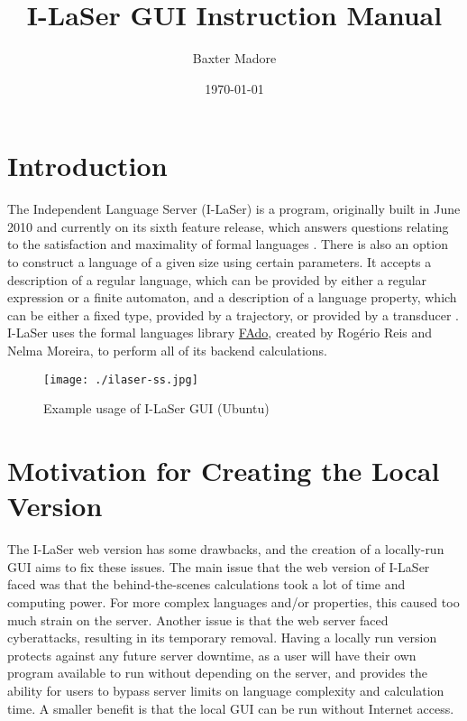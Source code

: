 \documentclass{article}
\title{I-LaSer GUI Instruction Manual}
\author{Baxter Madore}
\date{\today}
\begin{document}
\maketitle
\tableofcontents

\section{Introduction}
\par The Independent Language Server (I-LaSer) is a program, originally built in June 2010 and currently on its sixth feature release, which answers questions relating to the satisfaction and maximality of formal languages \cite{Properties}. There is also an option to construct a language of a given size using certain parameters. It accepts a description of a regular language, which can be provided by either a regular expression or a finite automaton, and a description of a language property, which can be either a fixed type, provided by a trajectory, or provided by a transducer \cite{LaSer}.
I-LaSer uses the formal languages library \href{https://fado.dcc.fc.up.pt/}{FAdo}\cite{FAdo}, created by Rogério Reis and Nelma Moreira, to perform all of its backend calculations.

\begin{center}
\begin{figure}[htb]
\texttt{[image: ./ilaser-ss.jpg]}
\caption{Example usage of I-LaSer GUI (Ubuntu)}
\end{figure}
\end{center}

\section{Motivation for Creating the Local Version}
\par The I-LaSer web version has some drawbacks, and the creation of a locally-run GUI aims to fix these issues.
The main issue that the web version of I-LaSer faced was that the behind-the-scenes calculations took a lot of time and computing power. For more complex languages and/or properties, this caused too much strain on the server. Another issue is that the web server faced cyberattacks, resulting in its temporary removal. Having a locally run version protects against any future server downtime, as a user will have their own program available to run without depending on the server, and provides the ability for users to bypass server limits on language complexity and calculation time. A smaller benefit is that the local GUI can be run without Internet access.
\end{document}
